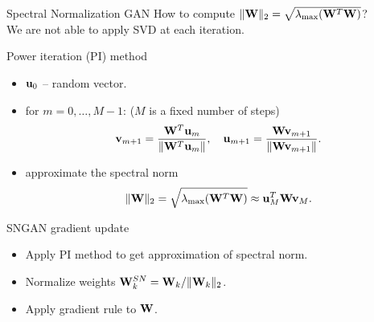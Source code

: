 \begin{frame}{Spectral Normalization GAN}
	How to compute $ \| \mathbf{W} \|_2 = \sqrt{\lambda_{\text{max}}(\mathbf{W}^T \mathbf{W})}$? \\
	We are not able to apply SVD at each iteration.
	 \begin{block}{Power iteration (PI) method}
	 	\vspace{-0.2cm}
	 	\begin{itemize}
	 		\item $\mathbf{u}_0$ -- random vector.
	 		\item for $m = 0, \dots, M - 1$: ($M$ is a fixed number of steps)
	 		\vspace{-0.3cm}
	 		\[
	 			\mathbf{v}_{m+1} = \frac{\mathbf{W}^T \mathbf{u}_{m}}{\| \mathbf{W}^T \mathbf{u}_{m} \|}, \quad \mathbf{u}_{m+1} = \frac{\mathbf{W} \mathbf{v}_{m+1}}{\| \mathbf{W} \mathbf{v}_{m+1} \|}.
	 		\]
	 		\item approximate the spectral norm
	 		\vspace{-0.3cm}
	 		\[
	 			\| \mathbf{W} \|_2 = \sqrt{\lambda_{\text{max}}(\mathbf{W}^T \mathbf{W})} \approx \mathbf{u}_{M}^T \mathbf{W} \mathbf{v}_{M}.
	 		\]
	 	\end{itemize}
	 \end{block}
	 \vspace{-0.5cm}
 	\begin{block}{SNGAN gradient update}
 		\begin{itemize}
 			\item Apply PI method to get approximation of spectral norm.
 			\item Normalize weights $\mathbf{W}^{SN}_k = \mathbf{W}_k / \|\mathbf{W}_k\|_2$.
 			\item Apply gradient rule to $\mathbf{W}$.
 		\end{itemize}
 	\end{block}

\end{frame}
